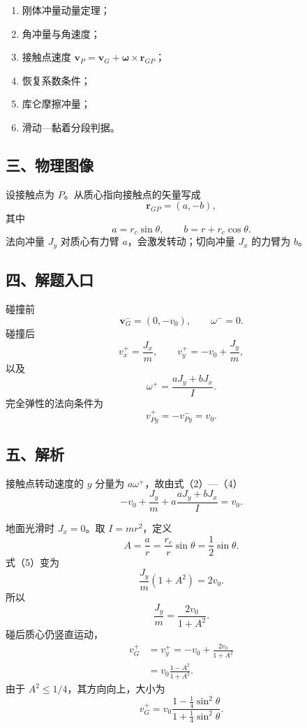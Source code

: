 \documentclass[12pt,a4paper,UTF8]{ctexart}
\newcommand{\tightlist}{\setlength{\itemsep}{0pt}\setlength{\parskip}{0pt}}
\begin{document}
\begin{enumerate}
\def\labelenumi{\arabic{enumi}.}
\tightlist
\item
  刚体冲量动量定理；
\item
  角冲量与角速度；
\item
  接触点速度 \(\bm v_P=\bm v_G+\bm\omega\times\bm r_{GP}\)；
\item
  恢复系数条件；
\item
  库仑摩擦冲量；
\item
  滑动---黏着分段判据。
\end{enumerate}

\subsection{三、物理图像}\label{ux4e09ux7269ux7406ux56feux50cf-3}

设接触点为 \(P\)。从质心指向接触点的矢量写成 \[
\bm r_{GP}=(a,-b),
\] 其中 \[
a=r_c\sin\theta,\qquad
b=r+r_c\cos\theta. \tag{1}
\] 法向冲量 \(J_y\) 对质心有力臂 \(a\)，会激发转动；切向冲量 \(J_x\)
的力臂为 \(b\)。

\subsection{四、解题入口}\label{ux56dbux89e3ux9898ux5165ux53e3-3}

碰撞前 \[
\bm v_G^-=(0,-v_0),\qquad \omega^-=0.
\] 碰撞后 \[
v_x^+=\frac{J_x}{m},\qquad
v_y^+=-v_0+\frac{J_y}{m}, \tag{2}
\] 以及 \[
\omega^+=\frac{aJ_y+bJ_x}{I}. \tag{3}
\] 完全弹性的法向条件为 \[
v_{Py}^+=-v_{Py}^-=v_0. \tag{4}
\]

\subsection{五、解析}\label{ux4e94ux89e3ux6790-3}

接触点转动速度的 \(y\) 分量为 \(a\omega^+\)，故由式（2）---（4） \[
-v_0+\frac{J_y}{m}
+a\frac{aJ_y+bJ_x}{I}=v_0. \tag{5}
\]

地面光滑时 \(J_x=0\)。取 \(I=mr^2\)，定义 \[
A=\frac ar=\frac{r_c}{r}\sin\theta=\frac12\sin\theta.
\] 式（5）变为 \[
\frac{J_y}{m}(1+A^2)=2v_0.
\] 所以 \[
\frac{J_y}{m}=\frac{2v_0}{1+A^2}.
\] 碰后质心仍竖直运动， \[
\begin{aligned}
v_G^+
&=v_y^+
=-v_0+\frac{2v_0}{1+A^2}\\
&=v_0\frac{1-A^2}{1+A^2}.
\end{aligned}
\] 由于 \(A^2\le1/4\)，其方向向上，大小为 \[
\boxed{
v_G^+=v_0
\frac{1-\frac14\sin^2\theta}
{1+\frac14\sin^2\theta}
}. \tag{6}
\]
\end{document}
